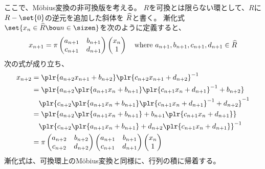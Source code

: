 {	ここで、M\"{o}bius変換の非可換版を考える。
	$R$を可換とは限らない環として、$R$に$R-\set{0}$の逆元を追加した斜体を
	$\widehat{R}$と書く。
	漸化式$\set{x_n\in\what{R}\bou n\in\sizen}$を次のように定義すると、
	\begin{equation*}\begin{split}
		x_{n+1} = \pi \begin{pmatrix}
			a_{n+1} & b_{n+1} \\ c_{n+1} & d_{n+1}
		\end{pmatrix}\begin{pmatrix}{x_n}\\{1}\end{pmatrix}
		\quad\text{where } a_{n+1},b_{n+1},c_{n+1},d_{n+1}\in\widehat{R}
	\end{split}\end{equation*}
	次の式が成り立ち、
	\begin{equation*}\begin{split}
		x_{n+2} &= \plr{a_{n+2}x_{n+1} + b_{n+2}}
			\plr{c_{n+2}x_{n+1} + d_{n+2}}^{-1} \\
		&= \plr{a_{n+2}{\plr{a_{n+1}x_n + b_{n+1}}
			\plr{c_{n+1}x_n+d_{n+1}}^{-1}} + b_{n+2}} \\
		&\quad \plr{c_{n+2}{\plr{a_{n+1}x_n + b_{n+1}}
			\plr{c_{n+1}x_n+d_{n+1}}^{-1} + d_{n+2}}}^{-1} \\
		&= \plr{a_{n+2}\plr{a_{n+1}x_n + b_{n+1}}
			+ b_{n+1}\plr{c_{n+1}x_n+d_{n+1}}} \\
		&\quad \plr{c_{n+2}\plr{a_{n+1}x_n + b_{n+1}}
			+ d_{n+2}\plr{c_{n+1}x_n+d_{n+1}}}^{-1} \\
		&= \pi \begin{pmatrix}
			a_{n+2} & b_{n+2} \\ c_{n+2} & d_{n+2}
		\end{pmatrix} \begin{pmatrix}
			a_{n+1} & b_{n+1} \\ c_{n+1} & d_{n+1}
		\end{pmatrix}\pvec{x_n}{1}
	\end{split}\end{equation*}
	漸化式は、可換環上のM\"{o}bius変換と同様に、行列の積に帰着する。

}
